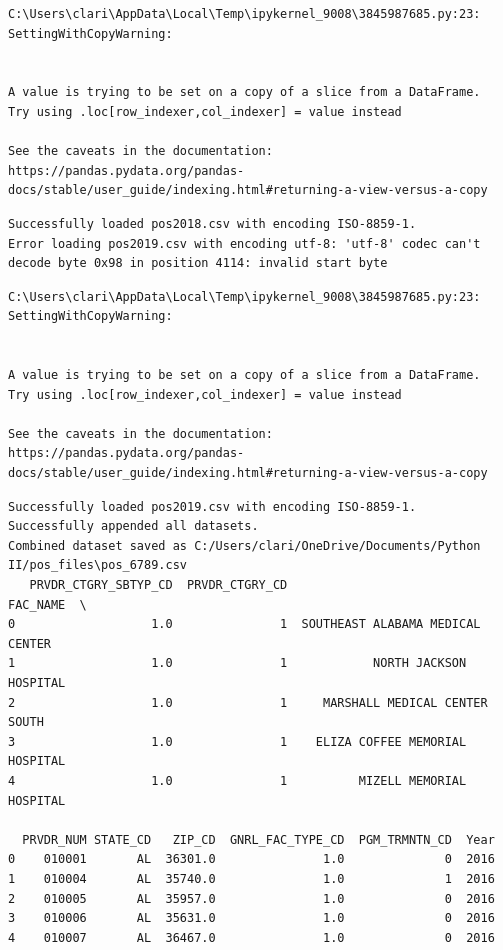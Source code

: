 \documentclass[
  letterpaper,
  DIV=11,
  numbers=noendperiod]{scrartcl}
\begin{document}
\begin{verbatim}
C:\Users\clari\AppData\Local\Temp\ipykernel_9008\3845987685.py:23: SettingWithCopyWarning:


A value is trying to be set on a copy of a slice from a DataFrame.
Try using .loc[row_indexer,col_indexer] = value instead

See the caveats in the documentation: https://pandas.pydata.org/pandas-docs/stable/user_guide/indexing.html#returning-a-view-versus-a-copy
\end{verbatim}

\begin{verbatim}
Successfully loaded pos2018.csv with encoding ISO-8859-1.
Error loading pos2019.csv with encoding utf-8: 'utf-8' codec can't decode byte 0x98 in position 4114: invalid start byte
\end{verbatim}

\begin{verbatim}
C:\Users\clari\AppData\Local\Temp\ipykernel_9008\3845987685.py:23: SettingWithCopyWarning:


A value is trying to be set on a copy of a slice from a DataFrame.
Try using .loc[row_indexer,col_indexer] = value instead

See the caveats in the documentation: https://pandas.pydata.org/pandas-docs/stable/user_guide/indexing.html#returning-a-view-versus-a-copy
\end{verbatim}

\begin{verbatim}
Successfully loaded pos2019.csv with encoding ISO-8859-1.
Successfully appended all datasets.
Combined dataset saved as C:/Users/clari/OneDrive/Documents/Python II/pos_files\pos_6789.csv
   PRVDR_CTGRY_SBTYP_CD  PRVDR_CTGRY_CD                          FAC_NAME  \
0                   1.0               1  SOUTHEAST ALABAMA MEDICAL CENTER   
1                   1.0               1            NORTH JACKSON HOSPITAL   
2                   1.0               1     MARSHALL MEDICAL CENTER SOUTH   
3                   1.0               1    ELIZA COFFEE MEMORIAL HOSPITAL   
4                   1.0               1          MIZELL MEMORIAL HOSPITAL   

  PRVDR_NUM STATE_CD   ZIP_CD  GNRL_FAC_TYPE_CD  PGM_TRMNTN_CD  Year  
0    010001       AL  36301.0               1.0              0  2016  
1    010004       AL  35740.0               1.0              1  2016  
2    010005       AL  35957.0               1.0              0  2016  
3    010006       AL  35631.0               1.0              0  2016  
4    010007       AL  36467.0               1.0              0  2016  
\end{verbatim}
\end{document}
